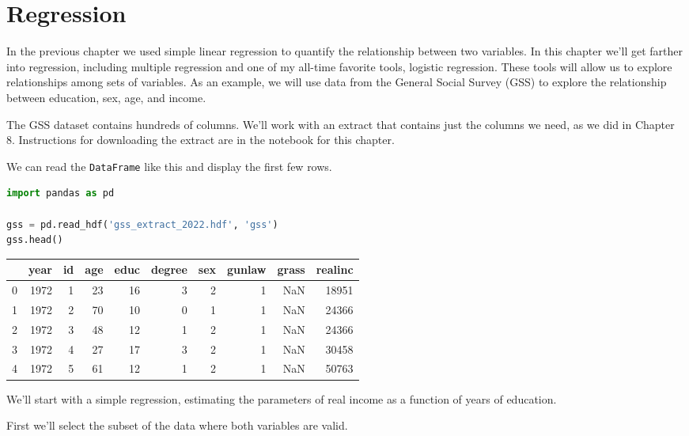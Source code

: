 \chapter{Regression}\label{regression}

In the previous chapter we used simple linear regression to quantify the
relationship between two variables. In this chapter we'll get farther
into regression, including multiple regression and one of my all-time
favorite tools, logistic regression. These tools will allow us to
explore relationships among sets of variables. As an example, we will
use data from the General Social Survey (GSS) to explore the
relationship between education, sex, age, and income.

The GSS dataset contains hundreds of columns. We'll work with an extract
that contains just the columns we need, as we did in Chapter 8.
Instructions for downloading the extract are in the notebook for this
chapter.


We can read the \passthrough{\lstinline!DataFrame!} like this and
display the first few rows.

\begin{lstlisting}[language=Python,style=source]
import pandas as pd

gss = pd.read_hdf('gss_extract_2022.hdf', 'gss')
gss.head()
\end{lstlisting}

\begin{tabular}{lrrrrrrrrr}
\toprule
 & year & id & age & educ & degree & sex & gunlaw & grass & realinc \\
\midrule
0 & 1972 & 1 & 23 & 16 & 3 & 2 & 1 & NaN & 18951 \\
1 & 1972 & 2 & 70 & 10 & 0 & 1 & 1 & NaN & 24366 \\
2 & 1972 & 3 & 48 & 12 & 1 & 2 & 1 & NaN & 24366 \\
3 & 1972 & 4 & 27 & 17 & 3 & 2 & 1 & NaN & 30458 \\
4 & 1972 & 5 & 61 & 12 & 1 & 2 & 1 & NaN & 50763 \\
\bottomrule
\end{tabular}

We'll start with a simple regression, estimating the parameters of real
income as a function of years of education.

\pagebreak

First we'll select the subset of the data where both variables are valid.

